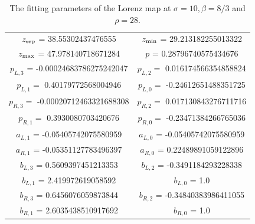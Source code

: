 \begin{table}[H]
    \centering
    \begin{tabular}{|c|c|}
    \hline 
         $z_{\rm sep}$ = 38.55302437476555 &
         $z_{\rm min}$ =  29.213182255013322 \\ 
         $z_{\rm max}$ =  47.978140718671284 & 
         $p$ = 0.28796740575434676   \\
         $p_{L,3}$ = -0.00024683786275242047 & $p_{L,2} = $ 
         0.016174566354858824 \\
         $p_{L,1} = $ 0.40179772568004946 & 
         $p_{L, 0}  = $ -0.24612651488351725 \\
         $p_{R,3} = $ -0.00020712463321688308 & 
         $p_{R,2} = $ 0.017130843276711716 \\
         $p_{R, 1} = $ 0.3930080703420676 & 
         $p_{R, 0} = $ -0.23471384266765036 \\
         $a_{L,1}$ = -0.05405742075580959 & $a_{L,0}$ = -0.05405742075580959 \\
         $a_{R,1}$ = -0.05351127783496397 & $a_{R,0}$ = 0.22489891059122896 \\
         $b_{L,3}$ = 0.5609397451213353 & $b_{L,2}$ = -0.3491184293228338 \\  $b_{L,1}$ = 2.419972619058592 & $b_{L,0}$ = 1.0 \\
         $b_{R,3}$ = 0.6456076059873844 & $b_{R,2}$ = -0.34840383986411055 \\ $b_{R,1}$ = 2.6035438510917692 &  $b_{R,0}$ = 1.0 \\
         \hline
    \end{tabular}
    \caption{The fitting parameters of the Lorenz map at $\sigma = 10, \beta = 8/3$ and $\rho = 28.$}
    \label{tab:lorenzFit}
\end{table}

